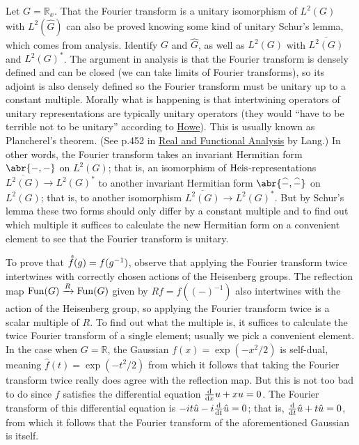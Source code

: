 \documentclass[../../rtnotes.tex]{subfiles}
\begin{document}
Let $G = \mathbb R_x$. That the Fourier transform is a unitary isomorphism of $L^2(G)$ with $L^2(\widehat G)$ can also be proved knowing some kind of unitary Schur's lemma, which comes from analysis. Identify $G$ and $\widehat G$, as well as $L^2(G)$ with $\overline{L^2(G)}$ and $L^2(G)^\ast$. The argument in analysis is that the Fourier transform is densely defined and can be closed (we can take limits of Fourier transforms), so its adjoint is also densely defined so the Fourier transform must be unitary up to a constant multiple. Morally what is happening is that intertwining operators of unitary representations are typically unitary operators (they would ``have to be terrible not to be unitary'' according to \href{https://utexas.instructure.com/courses/1428938/files/86306747?wrap=1}{Howe}). This is usually known as Plancherel's theorem. (See p.452 in \href{https://59clc.wordpress.com/wp-content/uploads/2012/08/real-and-functional-analysis-lang.pdf}{Real and Functional Analysis} by Lang.) In other words, the Fourier transform takes an invariant Hermitian form $\abr{-,-}$ on $L^2(G)$; that is, an isomorphism of $\operatorname{Heis}$-representations $\overline{L^2(G)}\to L^2(G)^\ast$ to another invariant Hermitian form $\abr{\widehat -,\widehat -}$ on $L^2(G)$; that is, to another isomorphism $\overline{L^2(G)}\to L^2(G)^\ast$. But by Schur's lemma these two forms should only differ by a constant multiple and to find out which multiple it suffices to calculate the new Hermitian form on a convenient element to see that the Fourier transform is unitary.

To prove that $~\dhat{\!\!f}(g) = f(g^{-1})$, observe that applying the Fourier transform twice intertwines with correctly chosen actions of the Heisenberg groups. The reflection map $\operatorname{Fun}(G)\xrightarrow{R}\operatorname{Fun}(G)$ given by $Rf = f((-)^{-1})$ also intertwines with the action of the Heisenberg group, so applying the Fourier transform twice is a scalar multiple of $R$. To find out what the multiple is, it suffices to calculate the twice Fourier transform of a single element; usually we pick a convenient element. In the case when $G = \mathbb R$, the Gaussian $f(x) = \exp(-x^2/2)$ is self-dual, meaning $\hat f(t) = \exp(-t^2/2)$ from which it follows that taking the Fourier transform twice really does agree with the reflection map. But this is not too bad to do since $f$ satisfies the differential equation $\dv{x}u+xu = 0$. The Fourier transform of this differential equation is $-it\hat u - i\dv{t}\hat u = 0$; that is, $\dv{t}\hat u+t\hat u = 0$, from which it follows that the Fourier transform of the aforementioned Gaussian is itself.
\end{document}
